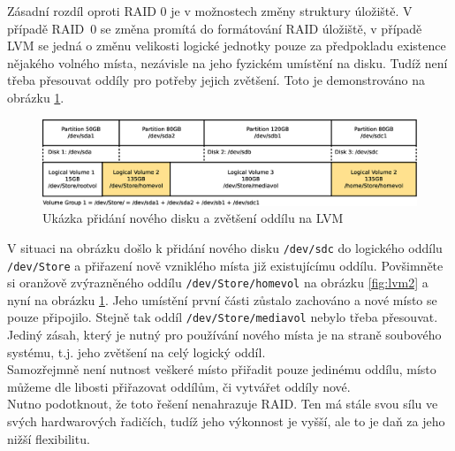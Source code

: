 Zásadní rozdíl oproti RAID 0 je v možnostech změny struktury úložiště. V případě RAID~0 se změna promítá do formátování RAID úložiště, v případě LVM se jedná o změnu velikosti logické jednotky pouze za předpokladu existence nějakého volného místa, nezávisle na jeho fyzickém umístění na disku. Tudíž není třeba přesouvat oddíly pro potřeby jejich zvětšení. Toto je demonstrováno na obrázku \ref{fig:lvm3}.
\begin{figure}[] 
    \centering
    \includegraphics[scale=0.32]{obrazky/lvm3.eps}
    \caption{Ukázka přidání nového disku a zvětšení oddílu na LVM}
    \label{fig:lvm3}
\end{figure}
V situaci na obrázku došlo k přidání nového disku \texttt{/dev/sdc} do logického oddílu \texttt{/dev/Store} a přiřazení nově vzniklého místa již existujícímu oddílu. Povšimněte si oranžově zvýrazněného oddílu \texttt{/dev/Store/homevol} na obrázku \ref{fig:lvm2} a nyní na obrázku \ref{fig:lvm3}. Jeho umístění první části zůstalo zachováno a nové místo se pouze připojilo. Stejně tak oddíl \texttt{/dev/Store/mediavol} nebylo třeba přesouvat. Jediný zásah, který je nutný pro používání nového místa je na straně soubového systému, t.j. jeho zvětšení na celý logický oddíl.\\
Samozřejmně není nutnost veškeré místo přiřadit pouze jedinému oddílu, místo můžeme dle libosti přiřazovat oddílům, či vytvářet oddíly nové.\\
Nutno podotknout, že toto řešení nenahrazuje RAID. Ten má stále svou sílu ve svých hardwarových řadičích, tudíž jeho výkonnost je vyšší, ale to je daň za jeho nižší flexibilitu.

